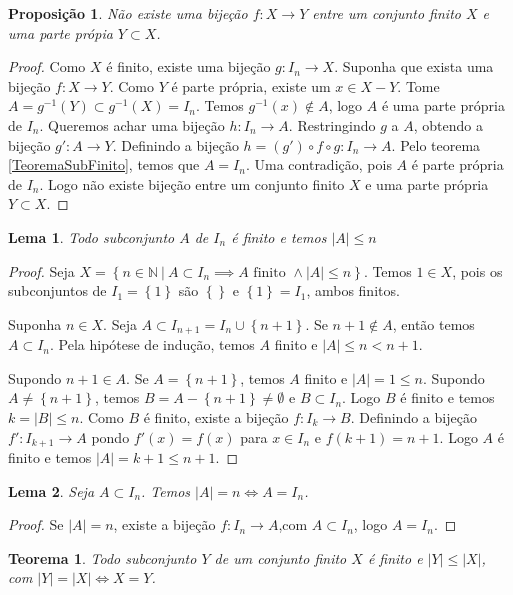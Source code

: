 \documentclass{article}
\theoremstyle{plain}
\newtheorem{prop}{Proposição}[section]
\newtheorem{teo}{Teorema}
\newtheorem{lema}{Lema}
\theoremstyle{definition}
\theoremstyle{remark}
\begin{document}
\begin{prop}
	Não existe uma bijeção $f:X\to Y$ entre um conjunto finito $X$ e uma parte própia $Y \subset X$.
\end{prop}
\begin{proof}
	\label{propPartePropria}
	Como $X$ é finito, existe uma bijeção $g: I_n \to X$. Suponha que exista uma bijeção $f:X\to Y$. Como $Y$ é parte própria, existe um $x\in X -Y$. Tome $A = g^{-1}(Y)\subset g^{-1}(X) = I_n$. Temos $g^{-1}(x) \not \in A$, logo $A$ é uma parte própria de $I_n$. Queremos achar uma bijeção $h: I_n \to A$. Restringindo $g$ a $A$, obtendo a bijeção $g':A\to Y$. Definindo a bijeção $h = (g') \circ f \circ g : I_n \to A$. Pelo teorema \ref{TeoremaSubFinito}, temos que $A = I_n$. Uma contradição, pois $A$ é parte própria de $I_n$. Logo não existe bijeção entre um conjunto finito $X$ e uma parte própria $Y\subset X$.
\end{proof}
\begin{lema}
	Todo subconjunto $A$ de $I_n$ é finito e temos $|A| \leq n$ 
\end{lema}
\begin{proof}
	Seja $X = \left\{ n\in \mathbb{N} \: | \:  A \subset I_n \implies A \text{ finito } \land |A| \leq n \right\}$. Temos $1 \in X$, pois os subconjuntos de $I_1 = \left\{1\right\}$ são $\left\{\right\} $ e $\left\{1\right\} = I_1$, ambos finitos. 

	Suponha $n \in X$.  Seja $A \subset I_{n+1} = I_n\cup \left\{n+1\right\}$.  Se $n+1\not \in A$, então temos $A \subset I_n$. Pela hipótese de indução, temos $A$ finito e $|A| \leq n < n+1$. 

	Supondo $n+1\in A$. Se $A = \left\{n+1\right\}$, temos $A$ finito e $|A| = 1 \leq n$.  Supondo $A \neq \left\{n+1\right\}$, temos $B = A-\left\{n+1\right\} \neq \emptyset$ e $B\subset I_n$. Logo $B$ é finito e temos $ k = |B| \leq n$. Como $B$ é finito, existe a bijeção $f: I_k \to B$. Definindo a bijeção $f': I_{k+1} \to A$ pondo $f'(x) = f(x)$ para $x\in I_n$ e $f(k+1) = n+1$.  Logo $A$ é finito e temos $|A| = k+1 \leq n+1$.


\end{proof}
\begin{lema}
	Seja $A\subset I_n$. Temos $|A| = n \iff A = I_n$.
\end{lema}
\begin{proof}
	Se $|A| = n$, existe a bijeção $f: I_n \to A$,com $A \subset I_n$, logo $A = I_n$.
\end{proof}
\begin{teo}
	Todo subconjunto $Y$ de um conjunto finito $X$ é finito e $|Y| \leq |X|$, com $|Y| = |X| \iff X = Y$.
\end{teo}
\end{document}
